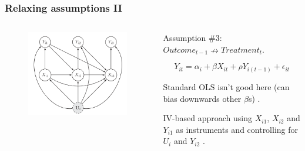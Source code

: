 \documentclass[11pt,english,dvipsnames,aspectratio=169,handout]{beamer}\usepackage[]{graphicx}\usepackage[]{xcolor}
\begin{document}
\begin{frame}
	\frametitle{Relaxing assumptions II}
	
	\begin{columns}
		\begin{column}{0.6\textwidth}
			\begin{figure}
				\centering
				\includegraphics[scale=0.4]{../04-figures/09/03.PNG}
			\end{figure}
		\end{column}
		\begin{column}{0.4\textwidth}
			\footnotesize
			Assumption \#3: $Outcome_{t-1} \nrightarrow Treatment_t$.\pause
			
			\begin{equation}
				Y_{it} = \alpha_i + \beta X_{it} + \rho Y_{i(t-1)} + \epsilon_{it}\nonumber
			\end{equation}\pause
		
		Standard OLS isn't good here (can bias downwards other $\beta$s) \cite{achen_why_2000}.\bigskip\pause
		
		IV-based approach using $X_{i1}$, $X_{i2}$ and $Y_{i1}$ as instruments and controlling for $U_i$ and $Y_{i2}$ \cite{arellano_tests_1991}.
		\end{column}
	\end{columns}
	
\end{frame}
\end{document}
